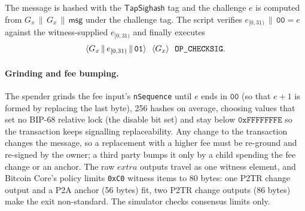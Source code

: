 The message is hashed with the $\mathsf{TapSighash}$ tag and the
challenge $e$ is computed from $G_x \,\|\, G_x \,\|\, \mathsf{msg}$ under
the challenge tag. The script verifies $e_{[0,31)} \,\|\, \mathtt{00} = e$
against the witness-supplied $e_{[0,31)}$ and finally executes
\[
\langle G_x \,\|\, e_{[0,31)} \,\|\, \mathtt{01}\rangle\ \ \langle G_x\rangle\ \ \op{CHECKSIG}.
\]

\paragraph{Grinding and fee bumping.} The spender grinds the fee input's
\texttt{nSequence} until $e$ ends in $\mathtt{00}$ (so that $e + 1$ is
formed by replacing the last byte), 256 hashes on average, choosing
values that set no BIP-68 relative lock (the disable bit set) and stay
below $\mathtt{0xFFFFFFFE}$ so the transaction keeps signalling
replaceability. Any change to the transaction changes the message, so a
replacement with a higher fee must be re-ground and re-signed by the
owner; a third party bumps it only by a child spending the fee change or
an anchor. The raw $\mathit{extra}$ outputs travel as one witness element,
and Bitcoin Core's policy limits \texttt{0xC0} witness items to 80 bytes:
one P2TR change output and a P2A anchor (56 bytes) fit, two P2TR change
outputs (86 bytes) make the exit non-standard. The simulator checks
consensus limits only.
